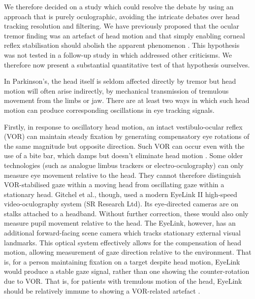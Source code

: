 \documentclass[jou,a4paper]{apa6}
\begin{document}
We therefore decided on a study which could resolve the debate by using an approach that is purely oculographic, avoiding the intricate debates over head tracking resolution and filtering. We have previously proposed that the ocular tremor finding was an artefact of head motion and that simply enabling corneal reflex stabilisation should abolish the apparent phenomenon \citep{MacAskill2013Ocular-tremor-i}. This hypothesis was not tested in a follow-up study in which \citet{Gitchel2014Experimental-su} addressed other criticisms. We therefore now present a substantial quantitative test of that hypothesis ourselves. 

In Parkinson's, the head itself is seldom affected directly by tremor but head motion will often arise indirectly, by mechanical transmission of tremulous movement from the limbs or jaw. There are at least two ways in which such head motion can produce corresponding oscillations in eye tracking signals. 

Firstly, in response to oscillatory head motion, an intact vestibulo-ocular reflex (VOR) can maintain steady fixation by generating compensatory eye rotations of the same magnitude but opposite direction. Such VOR can occur even with the use of a bite bar, which damps but doesn't eliminate head motion \citep{Saifee2014Tremor-of-the-e}. Some older technologies (such as analogue limbus trackers or electro-oculography) can only measure eye movement relative to the head. They cannot therefore distinguish VOR-stabilised gaze within a moving head from oscillating gaze within a stationary head. Gitchel et al., though, used a modern EyeLink II high-speed video-oculography system (SR Research Ltd). Its eye-directed cameras are on stalks attached to a headband. Without further correction, these would also only measure pupil movement relative to the head. The EyeLink, however, has an additional forward-facing scene camera which tracks stationary external visual landmarks. This optical system effectively allows for the compensation of head motion, allowing measurement of gaze direction relative to the environment. That is, for a person maintaining fixation on a target despite head motion, EyeLink would produce a stable gaze signal, rather than one showing the counter-rotation due to VOR. That is, for patients with tremulous motion of the head, EyeLink should be relatively immune to showing a VOR-related artefact \citep[counter to ourselves and others previously implicating the VOR as being the artefactual basis of ``ocular tremor'' ][]{Kaski2013Eye-oscillation,Kaski2013Ocular-tremor-i,MacAskill2013Ocular-tremor-i}.
\end{document}
